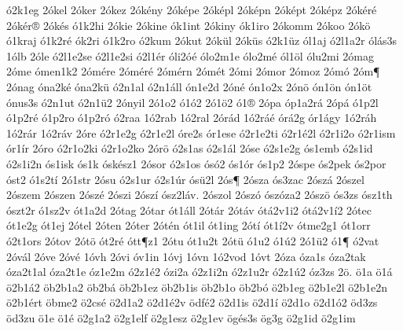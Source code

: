 {^^f32k1eg
2^^f3kel
2^^f3ker
2^^f3kez
2^^f3k^^e9ny
2^^f3k^^e9pe
2^^f3k^^e9pl
2^^f3k^^e9pn
2^^f3k^^e9pt
2^^f3k^^e9pz
2^^f3k^^e9r^^e9
2^^f3k^^e9r^^ae
2^^f3k^^e9s
^^f31k2hi
2^^f3kie
2^^f3kine
^^f3k1int
2^^f3kiny
^^f3k1iro
2^^f3komm
2^^f3koo
2^^f3k^^f6
^^f31kraj
^^f31k2r^^e9
^^f3k2ri
^^f31k2ro
^^f32kum
2^^f3kut
2^^f3k^^fcl
2^^f3k^^fcs
^^f32k1^^fcz
^^f3l1aj
^^f32l1a2r
^^f3l^^e1s3s
1^^f3lb
2^^f3le
^^f32l1e2se
^^f32l1e2si
^^f32l1^^e9r
^^f3li2^^f3^^e9
^^f3lo2m1e
^^f3lo2m^^e9
^^f3l1^^f6l
^^f3lu2mi
2^^f3mag
2^^f3me
^^f3men1k2
2^^f3m^^e9re
2^^f3m^^e9r^^e9
2^^f3m^^e9rn
2^^f3m^^e9t
2^^f3mi
2^^f3mor
2^^f3moz
2^^f3m^^f3
2^^f3m^^b6
2^^f3nag
^^f3na2k^^e9
^^f3na2k^^fc
^^f32n1al
^^f32n1^^e1ll
^^f3n1e2d
2^^f3n^^e9
^^f3n1o2x
2^^f3n^^f6
^^f3n1^^f6n
^^f3n1^^f6t
^^f3nus3s
^^f32n1ut
^^f32n1^^fc2
2^^f3nyil
2^^f31o2
^^f31^^f32
2^^f31^^f62
^^f31^^ae
2^^f3pa
^^f3p1a2r^^e1
2^^f3p^^e1
^^f31p2l
^^f31p2r^^e9
^^f31p2ro
^^f31p2r^^f3
^^f32raa
1^^f32rab
1^^f32ral
2^^f3r^^e1d
1^^f32r^^e1^^e9
^^f3r^^e12g
^^f3r1^^e1gy
1^^f32r^^e1h
1^^f32r^^e1r
1^^f32r^^e1v
2^^f3re
^^f32r1e2g
^^f32r1e2l
^^f3re2s
^^f3r1ese
^^f32r1e2ti
^^f32r1^^e92l
^^f32r1i2o
^^f32r1ism
^^f3r1^^edr
2^^f3ro
^^f32r1o2ki
^^f32r1o2ko
2^^f3r^^f6
^^f32s1as
^^f32s1^^e1l
2^^f3se
^^f32s1e2g
^^f3s1emb
^^f32s1id
^^f32s1i2n
^^f3s1isk
^^f3s1k
^^f3sk^^e9sz1
2^^f3sor
^^f32s1os
^^f3s^^f32
^^f3s1^^f3r
^^f3s1p2
2^^f3spe
^^f3s2pek
^^f3s2por
^^f3st2
^^f31s2t^^ed
2^^f31str
2^^f3su
^^f32s1ur
^^f32s1^^far
^^f3s^^fc2l
2^^f3s^^b6
2^^f3sza
^^f3s3zac
2^^f3sz^^e1
2^^f3szel
2^^f3szem
2^^f3szen
2^^f3sz^^e9
2^^f3szi
2^^f3sz^^ed
^^f3sz2l^^e1v.
2^^f3szol
2^^f3sz^^f3
^^f3sz^^f3za2
2^^f3sz^^f6
^^f3s3zs
^^f3sz1th
^^f3szt2r
^^f31sz2v
^^f3t1a2d
2^^f3tag
2^^f3tar
^^f3t1^^e1ll
2^^f3t^^e1r
2^^f3t^^e1v
^^f3t^^e12v1i2
^^f3t^^e12v1^^ed2
2^^f3tec
^^f3t1e2g
^^f3t1ej
2^^f3tel
2^^f3ten
2^^f3ter
2^^f3t^^e9n
^^f3t1il
^^f3t1ing
2^^f3t^^ed
^^f3t1^^ed2v
^^f3tme2g1
^^f3t1orr
^^f32t1ors
2^^f3tov
2^^f3t^^f6
^^f3t2r^^e9
^^f3tt^^b6z1
2^^f3tu
^^f3t1u2t
2^^f3t^^fc
^^f31u2
^^f31^^fa2
2^^f31^^fc2
^^f31^^b6
^^f32vat
2^^f3v^^e1l
2^^f3ve
2^^f3v^^e9
1^^f3vh
2^^f3vi
^^f3v1in
1^^f3vj
1^^f3vn
1^^f32vod
1^^f3vt
2^^f3za
^^f3za1s
^^f3za2tak
^^f3za2t1al
^^f3za2t1e
^^f3z1e2m
^^f32z1^^e92
^^f3zi2a
^^f32z1i2n
^^f32z1u2r
^^f32z1^^fa2
^^f3z3zs
2^^f6.
^^f61a
^^f61^^e1
^^f62b1^^e12
^^f6b2b1a2
^^f6b2b^^e1
^^f6b2b1ez
^^f6b2b1is
^^f6b2b1o
^^f6b2b^^f3
^^f62b1eg
^^f62b1e2l
^^f62b1e2n
^^f62b1^^e9rt
^^f6bme2
^^f62cs^^e9
^^f62d1a2
^^f62d1^^e92v
^^f6df^^e92
^^f62d1is
^^f62d1^^ed
^^f62d1o
^^f62d1^^f32
^^f6d3zs
^^f6d3zu
^^f61e
^^f61^^e9
^^f62g1a2
^^f62g1elf
^^f62g1esz
^^f62g1ev
^^f6g^^e9s3s
^^f6g3g
^^f62g1id
^^f62g1im
}
